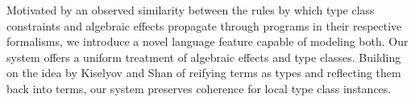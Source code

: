 Motivated by an observed similarity between the rules by which type class constraints and algebraic effects propagate through programs in their respective formalisms, we introduce a novel language feature capable of modeling both. Our system offers a uniform treatment of algebraic effects and type classes. Building on the idea \cite{kiselyov04} by Kiselyov and Shan of reifying terms as types and reflecting them back into terms, our system preserves coherence for local type class instances.
